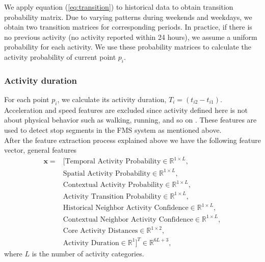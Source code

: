 \documentclass{sig-alternate}
\begin{document}
\noindent  We apply equation (\ref{eq:transition}) to historical data to obtain transition probability matrix. Due to varying patterns during weekends and weekdays, we obtain two transition matrices for corresponding periods. In practice, if there is no previous activity (no activity reported within 24 hours), we assume a uniform probability for each activity. We use these probability matrices to calculate the activity probability of current point $p_i$.



\subsubsection{Activity duration} For each point $p_i$, we calculate its activity duration, $T_i=(t_{i2}-t_{i1})$. \\



Acceleration and speed features are excluded since activity defined here is not about physical behavior such as walking, running, and so on \cite{Kwapisz2011ActivityAccelerometers}. These features are used to detect stop segments in the FMS system as mentioned above. \\


After the feature extraction process explained above we have the following feature vector, general features
\begin{equation}
\begin{split}
\mathbf{x} =  & [ \text{Temporal Activity Probability} \in \mathbb{R}^{1\times L}, \\
                      & \text{Spatial Activity Probability} \in \mathbb{R}^{1\times L}, \\
              	     & \text{Contextual Activity Probability} \in \mathbb{R}^{1\times L}, \\
          	     & \text{Activity Transition Probability} \in \mathbb{R}^{1\times L}, \\
                     & \text{Historical Neighbor Activity Confidence} \in \mathbb{R}^{1\times L}, \\
                     & \text{Contextual Neighbor Activity Confidence} \in \mathbb{R}^{1\times L}, \\
                    & \text{Core Activity Distances} \in \mathbb{R}^{1\times 2}, \\
                    &  \text{Activity Duration} \in \mathbb{R}^{1} ]^T \in \mathbb{R}^{6L+ 3},
\end{split}
 \end{equation}
 where $L$ is the number of activity categories.\par
\end{document}

